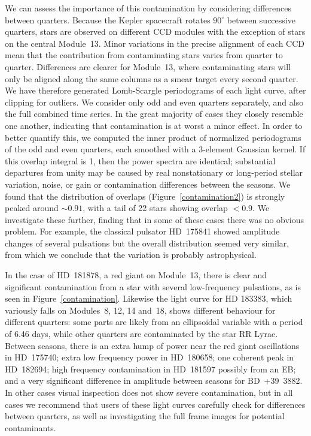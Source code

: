 \documentclass[a4paper,fleqn,usenatbib]{mnras}
\newcommand{\kepler}{\textit{Kepler}\xspace}
\begin{document}

We can assess the importance of this contamination by considering differences between quarters. Because the Kepler spacecraft rotates $90^\circ$ between successive quarters, stars are observed on different CCD modules with the exception of stars on the central Module~13. Minor variations in the precise alignment of each CCD mean that the contribution from contaminating stars varies from quarter to quarter. Differences are clearer for Module~13, where contaminating stars will only be aligned along the same columns as a smear target every second quarter. We have therefore generated Lomb-Scargle periodograms \citep{lomb,scargle} of each light curve, after clipping for outliers. We consider only odd and even quarters separately, and also the full combined time series. In the great majority of cases they closely resemble one another, indicating that contamination is at worst a minor effect. In order to better quantify this, we computed the inner product of normalized periodograms of the odd and even quarters, each smoothed with a 3-element Gaussian kernel. If this overlap integral is 1, then the power spectra are identical; substantial departures from unity may be caused by real nonstationary or long-period stellar variation, noise, or gain or contamination differences between the seasons. We found that the distribution of overlaps (Figure~\ref{contamination2}) is strongly peaked around $\sim 0.91$, with a tail of 22 stars showing overlap $< 0.9$. We investigate these further, finding that in some of these cases  there was no obvious problem. For example, the classical pulsator HD~175841 showed amplitude changes of several pulsations but the overall distribution seemed very similar, from which we conclude that the variation is probably astrophysical. 

In the case of HD~181878, a red giant on Module~13, there is clear and significant contamination from a star with several low-frequency pulsations, as is seen in Figure~\ref{contamination}. Likewise the light curve for HD 183383, which variously falls on Modules~8, 12, 14 and~18, shows different behaviour for different quarters: some parts are likely from an ellipsoidal variable with a period of 6.46 days, while other quarters are contaminated by the star RR Lyrae. Between seasons, there is an extra hump of power near the red giant oscillations in HD~175740; extra low frequency power in HD~180658; one coherent peak in  HD~182694; high frequency contamination in HD~181597 possibly from an EB; and a very significant difference in amplitude between seasons for BD~+39~3882. In other cases visual inspection does not show severe contamination, but in all cases we recommend that users of these light curves carefully check for differences between quarters, as well as investigating the full frame images for potential contaminants.
\end{document}
